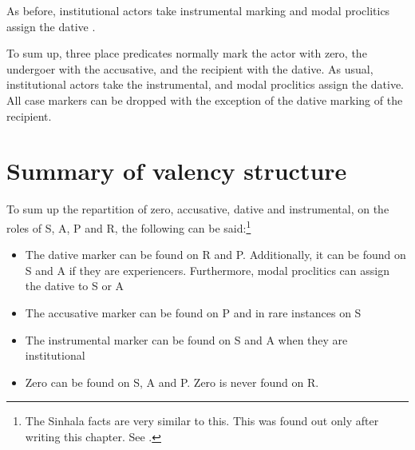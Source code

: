 

As before, institutional actors take instrumental marking  and modal proclitics assign the dative .




To sum up, three place predicates normally mark the actor with zero, the undergoer with the accusative, and the recipient with the dative. As usual, institutional actors take the instrumental, and modal proclitics assign the dative. All case markers can be dropped with the exception of the dative marking of the recipient.

\section{Summary of valency structure}\label{sec:argstr:Summaryofargumentrstructure}
To sum up the repartition of zero, accusative, dative and instrumental, on the roles of S, A, P and R, the following can be said:\footnote{The Sinhala facts are very similar to this. This was found out only after writing this chapter. See \citet{Gair1976sinhalasubject,Gair1991infl,Henadeerage2002}.}

\begin{itemize}
 \item The dative marker can be found on R and P. Additionally, it can be found on S and A if they are experiencers. Furthermore, modal proclitics can assign the dative to S or A
 \item The accusative marker can be found on P and in rare instances on S
 \item The instrumental marker can be found on S and A when they are institutional
 \item Zero can be found on S, A and P. Zero is never found on R.
\end{itemize}

